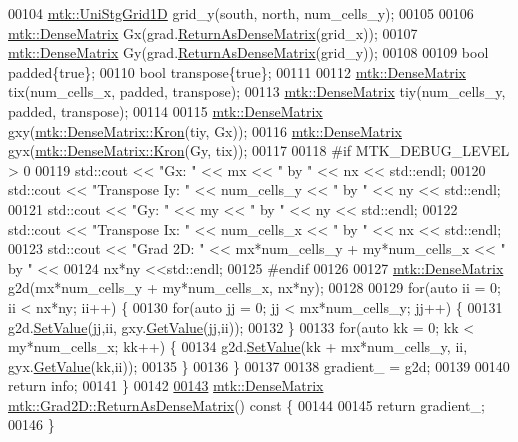 \begin{DoxyCode}
00104   \hyperlink{classmtk_1_1UniStgGrid1D}{mtk::UniStgGrid1D} grid\_y(south, north, num\_cells\_y);
00105 
00106   \hyperlink{classmtk_1_1DenseMatrix}{mtk::DenseMatrix} Gx(grad.\hyperlink{classmtk_1_1Grad1D_a77b2eddbe4ab03f469306c604d505b1a}{ReturnAsDenseMatrix}(grid\_x));
00107   \hyperlink{classmtk_1_1DenseMatrix}{mtk::DenseMatrix} Gy(grad.\hyperlink{classmtk_1_1Grad1D_a77b2eddbe4ab03f469306c604d505b1a}{ReturnAsDenseMatrix}(grid\_y));
00108 
00109   \textcolor{keywordtype}{bool} padded\{\textcolor{keyword}{true}\};
00110   \textcolor{keywordtype}{bool} transpose\{\textcolor{keyword}{true}\};
00111 
00112   \hyperlink{classmtk_1_1DenseMatrix}{mtk::DenseMatrix} tix(num\_cells\_x, padded, transpose);
00113   \hyperlink{classmtk_1_1DenseMatrix}{mtk::DenseMatrix} tiy(num\_cells\_y, padded, transpose);
00114 
00115   \hyperlink{classmtk_1_1DenseMatrix}{mtk::DenseMatrix} gxy(\hyperlink{classmtk_1_1DenseMatrix_a01d3d8bd502870f93bf3a88a0cc5fb49}{mtk::DenseMatrix::Kron}(tiy, Gx));
00116   \hyperlink{classmtk_1_1DenseMatrix}{mtk::DenseMatrix} gyx(\hyperlink{classmtk_1_1DenseMatrix_a01d3d8bd502870f93bf3a88a0cc5fb49}{mtk::DenseMatrix::Kron}(Gy, tix));
00117 
00118 \textcolor{preprocessor}{  #if MTK\_DEBUG\_LEVEL > 0}
00119   std::cout << \textcolor{stringliteral}{"Gx: "} << mx << \textcolor{stringliteral}{" by "} << nx << std::endl;
00120   std::cout << \textcolor{stringliteral}{"Transpose Iy: "} << num\_cells\_y << \textcolor{stringliteral}{" by "} << ny  << std::endl;
00121   std::cout << \textcolor{stringliteral}{"Gy: "} << my << \textcolor{stringliteral}{" by "} << ny << std::endl;
00122   std::cout << \textcolor{stringliteral}{"Transpose Ix: "} << num\_cells\_x << \textcolor{stringliteral}{" by "} << nx  << std::endl;
00123   std::cout << \textcolor{stringliteral}{"Grad 2D: "} << mx*num\_cells\_y + my*num\_cells\_x << \textcolor{stringliteral}{" by "} <<
00124     nx*ny <<std::endl;
00125 \textcolor{preprocessor}{  #endif}
00126 
00127   \hyperlink{classmtk_1_1DenseMatrix}{mtk::DenseMatrix} g2d(mx*num\_cells\_y + my*num\_cells\_x, nx*ny);
00128 
00129   \textcolor{keywordflow}{for}(\textcolor{keyword}{auto} ii = 0; ii < nx*ny; ii++) \{
00130     \textcolor{keywordflow}{for}(\textcolor{keyword}{auto} jj = 0; jj < mx*num\_cells\_y; jj++) \{
00131       g2d.\hyperlink{classmtk_1_1DenseMatrix_a784ce5784109ac86bfb9d8562b334b13}{SetValue}(jj,ii, gxy.\hyperlink{classmtk_1_1DenseMatrix_a4b23ecbebd970b5eea915dbb50691024}{GetValue}(jj,ii));
00132     \}
00133     \textcolor{keywordflow}{for}(\textcolor{keyword}{auto} kk = 0; kk < my*num\_cells\_x; kk++) \{
00134       g2d.\hyperlink{classmtk_1_1DenseMatrix_a784ce5784109ac86bfb9d8562b334b13}{SetValue}(kk + mx*num\_cells\_y, ii, gyx.\hyperlink{classmtk_1_1DenseMatrix_a4b23ecbebd970b5eea915dbb50691024}{GetValue}(kk,ii));
00135     \}
00136   \}
00137 
00138   gradient\_ = g2d;
00139 
00140   \textcolor{keywordflow}{return} info;
00141 \}
00142 
\hypertarget{mtk__grad__2d_8cc_source_l00143}{}\hyperlink{classmtk_1_1Grad2D_a4f5a17519455f833bb70b8434c272312}{00143} \hyperlink{classmtk_1_1DenseMatrix}{mtk::DenseMatrix} \hyperlink{classmtk_1_1Grad2D_a4f5a17519455f833bb70b8434c272312}{mtk::Grad2D::ReturnAsDenseMatrix}()\textcolor{keyword}{ const }\{
00144 
00145   \textcolor{keywordflow}{return} gradient\_;
00146 \}
\end{DoxyCode}
